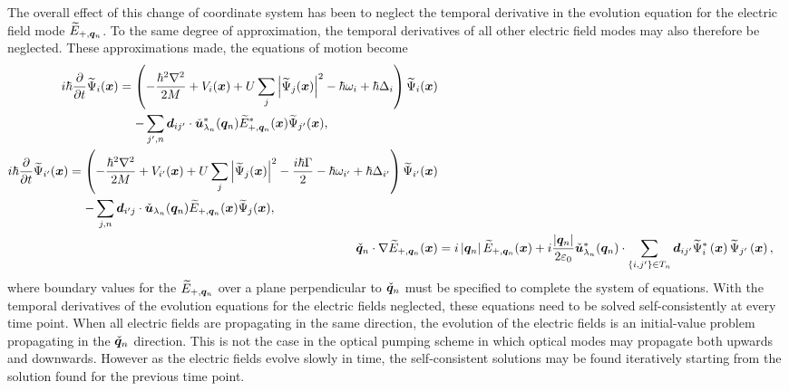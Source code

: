 The overall effect of this change of coordinate system has been to neglect the temporal derivative in the evolution equation for the electric field mode $\widetilde{E}_{+, \bm{q}_n}$.  To the same degree of approximation, the temporal derivatives of all other electric field modes may also therefore be neglected.  These approximations made, the equations of motion become
\begin{subequations}
    \begin{align}
        \begin{split}
            i \hbar \frac{\partial}{\partial t} \widetilde{\Psi}_i(\vect{x}) &= \left( -\frac{\hbar^2 \nabla^2}{2M} + V_i(\vect{x}) + U \sum_j \abs{\widetilde{\Psi}_j(\vect{x})}^2 - \hbar \omega_{i} + \hbar \Delta_i \right) \widetilde{\Psi}_i(\vect{x})\\
            &\relphantom{=} - \sum_{j',n} \vect{d}_{ij'} \cdot \unitvec{u}^*_{\lambda_n}(\vect{q}_n) \widetilde{E}_{+,\vect{q}_n}^*(\vect{x}) \widetilde{\Psi}_{j'}(\vect{x}),
        \end{split}\\
        \begin{split}
            i \hbar \frac{\partial}{\partial t} \widetilde{\Psi}_{i'}(\vect{x}) &= \left( -\frac{\hbar^2 \nabla^2}{2M} + V_{i'}(\vect{x}) + U \sum_j \abs{\widetilde{\Psi}_j(\vect{x})}^2 - \frac{i\hbar \Gamma}{2} - \hbar \omega_{i'} + \hbar \Delta_{i'}\right) \widetilde{\Psi}_{i'}(\vect{x})\\
            &\relphantom{=} - \sum_{j,n} \vect{d}_{i'j} \cdot \unitvec{u}_{\lambda_n}(\vect{q}_n) \widetilde{E}_{+,\vect{q}_n}(\vect{x}) \widetilde{\Psi}_{j}(\vect{x}),
        \end{split} \label{OpticalPumping:AtomicExcitedStateEvolution}\\
      \unitvec{q}_n \cdot \nabla \widetilde{E}_{+, \vect{q}_n}(\vect{x}) &= i \abs{\vect{q}_n} \widetilde{E}_{+, \vect{q}_n}(\vect{x}) + i \frac{\abs{\vect{q}_n}}{2 \varepsilon_0} \unitvec{u}^*_{\lambda_n}(\vect{q}_n) \cdot \sum_{\{i,j'\}\in T_n} \vect{d}_{ij'} \widetilde{\Psi}^*_i\left(\vect{x}\right) \widetilde{\Psi}_{j'}\left(\vect{x}\right),
    \end{align}
\end{subequations}
where boundary values for the $\widetilde{E}_{+, \bm{q}_n}$ over a plane perpendicular to $\check{\bm{q}}_n$ must be specified to complete the system of equations.  With the temporal derivatives of the evolution equations for the electric fields neglected, these equations need to be solved self-consistently at every time point.  When all electric fields are propagating in the same direction, the evolution of the electric fields is an initial-value problem propagating in the $\check{\bm{q}}_n$ direction.  This is not the case in the optical pumping scheme in which optical modes may propagate both upwards and downwards.  However as the electric fields evolve slowly in time, the self-consistent solutions may be found iteratively starting from the solution found for the previous time point.

